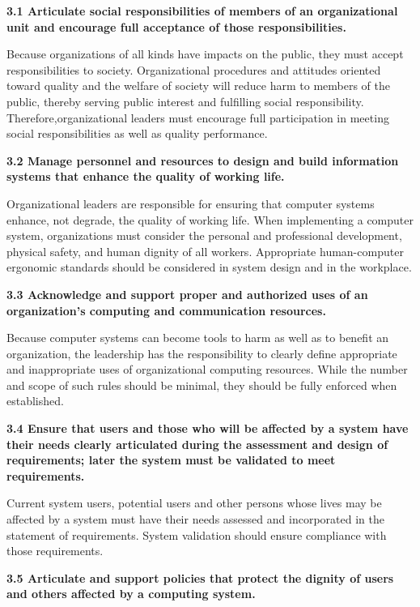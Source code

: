 \vspace{.1in}\noindent\textbf{3.1 Articulate social responsibilities of members of an organizational unit and encourage full acceptance of those responsibilities.}

Because organizations of all kinds have impacts on the public, they must accept responsibilities to society. Organizational procedures and attitudes oriented toward quality and the welfare of society will reduce harm to members of the public, thereby serving public interest and fulfilling social responsibility. Therefore,organizational leaders must encourage full participation in meeting social responsibilities as well as quality performance.

\vspace{.1in}\noindent\textbf{3.2 Manage personnel and resources to design and build information systems that enhance the quality of working life.}

Organizational leaders are responsible for ensuring that computer systems enhance, not degrade, the quality of working life. When implementing a computer system, organizations must consider the personal and professional development, physical safety, and human dignity of all workers. Appropriate human-computer ergonomic standards should be considered in system design and in the workplace.

\vspace{.1in}\noindent\textbf{3.3 Acknowledge and support proper and authorized uses of an organization's computing and communication resources.}

Because computer systems can become tools to harm as well as to benefit an organization, the leadership has the responsibility to clearly define appropriate and inappropriate uses of organizational computing resources. While the number and scope of such rules should be minimal, they should be fully enforced when established.

\vspace{.1in}\noindent\textbf{3.4 Ensure that users and those who will be affected by a system have their needs clearly articulated during the assessment and design of requirements; later the system must be validated to meet requirements.}

Current system users, potential users and other persons whose lives may be affected by a system must have their needs assessed and incorporated in the statement of requirements. System validation should ensure compliance with those requirements.

\vspace{.1in}\noindent\textbf{3.5 Articulate and support policies that protect the dignity of users and others affected by a computing system.}

